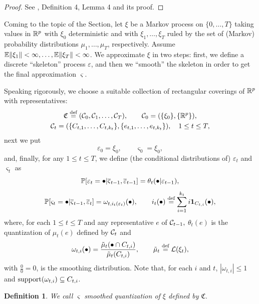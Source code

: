 \documentclass{article}              %
\newtheorem{definition}{Definition}
\begin{document}
\begin{proof}
See \cite{Smid09c}, Definition 4, Lemma 4 and its proof. 
\end{proof}

\noindent Coming to the topic of the Section, let $\xi$ be a Markov process
on $\{0,\dots,T\}$ taking values in $\mathbb{R}^{p}$ with $\xi_{0}$ deterministic and with $\xi_1,\dots,\xi_T$ ruled by 
the set of (Markov) probability distributions $\mu_{1},\dots,\mu_{T}$, respectively. Assume $\mathbb{E}\|\xi_{1}\|<\infty,\dots,\mathbb{E}\|\xi_{T}\|<\infty$. We approximate $\xi$ in two steps: first, we define a discrete ``skeleton'' process $\varepsilon$, and then we ``smooth'' the skeleton in order to get the final approximation $\varsigma$. 

Speaking rigorously, we choose a suitable collection of rectangular coverings of $\mathbb{R}^{p}$ with representatives: 
\begin{multline*}
\mathfrak{C}\stackrel{\text{\rm def}}{=}(\mathcal{C}_{0},\mathcal{C}_{1},\dots,\mathcal{C}_{T}),\qquad\mathcal{C}_{0}=(\{\xi_{0}\},\{\mathbb{R}^{p}\}),\\
\mathcal{C}_{t}=(\{C_{t,1},\dots,C_{t,k_{t}}\},\{e_{t,1},\dots,e_{t,k_{t}}\}),\quad1\leq t\leq T,
\end{multline*}
next  we put
\[
\varepsilon_{0}=\xi_{0},\qquad\varsigma_{0}=\xi_{0},
\]
and, finally, for any $1\leq t\leq T$, we define (the conditional distributions of) $\varepsilon_t$ and $\varsigma_t$ as  
\begin{equation}
\mathbb{P}[\varepsilon_{t}=\bullet|\overline{\varsigma}_{t-1},\overline{\varepsilon}_{t-1}]=\theta_{t}(\bullet|\varepsilon_{t-1}),\label{eq:skelet}
\end{equation}
\begin{equation}
\mathbb{P}[\varsigma_{t}=\bullet|\overline{\varsigma}_{t-1},\overline{\varepsilon}_{t}]=\omega_{t,i_{t}(\varepsilon_{t})}(\bullet),\qquad i_{t}(\bullet)\stackrel{\text{\rm def}}{=}\sum_{i=1}^{k_{t}}i\mathbf{1}_{C_{t,i}}(\bullet),\label{eq:vsdef}
\end{equation}
where, 
for each $1\leq t\leq T$ and any representative $e$ of $\mathcal{C}_{t-1},$
$\theta_{t}(e)$ is the quantization of $\mu_{t}(e)$ defined by $\mathcal{C}_{t}$
and 
\[
\omega_{t,i}(\bullet)=\frac{\tilde{\mu}_{t}(\bullet\cap C_{t,i})}{\tilde{\mu}_{t}(C_{t,i})},\qquad\tilde{\mu}_{t}\stackrel{\text{\rm def}}{=}\mathcal{L}(\xi_{t}),
\]
with $\frac{0}{0}=0$, is the smoothing distribution. Note that, for each $i$ and $t$, $|\omega_{t,i}|\leq1$
and $\mathrm{support}(\omega_{t,i})\subseteq C_{t,i}$. 

\begin{definition}
We call $\varsigma$ \emph{smoothed quantization of $\xi$ defined
by $\mathfrak{C}.$}
\end{definition}
\end{document}
